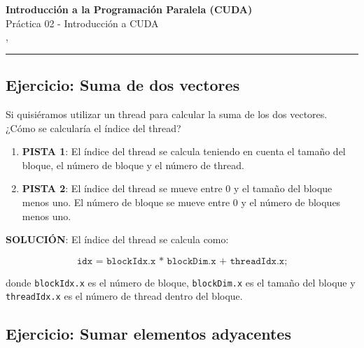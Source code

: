 



\begin{center}
  \LARGE\textbf{Introducción a la Programación Paralela (CUDA)} \\
  \Large{Práctica 02 - Introducción a CUDA} \\
  \normalsize{\currentsemester, \currentyear} \\
  \vspace{1em}
  \hrule
\end{center}

\setcounter{section}{2}



\newpage

\tableofcontents

\newpage

\subsection{Ejercicio: Suma de dos vectores}

Si quisiéramos utilizar un thread para calcular la suma de los dos vectores. ¿Cómo se calcularía el índice del thread?

\begin{enumerate}
  \item \textbf{PISTA 1}: El índice del thread se calcula teniendo en cuenta el tamaño del bloque, el número de bloque y
    el número de thread.

  \item \textbf{PISTA 2}: El índice del thread se mueve entre 0 y el tamaño del bloque menos uno. El número de bloque
    se mueve entre 0 y el número de bloques menos uno.

\end{enumerate}

\textbf{SOLUCIÓN}: El índice del thread se calcula como:

\begin{equation}
  \texttt{idx = blockIdx.x * blockDim.x + threadIdx.x;}
\end{equation}

donde \texttt{blockIdx.x} es el número de bloque, \texttt{blockDim.x} es el tamaño del bloque y \texttt{threadIdx.x} es
el número de thread dentro del bloque.

\subsection{Ejercicio: Sumar elementos adyacentes}

